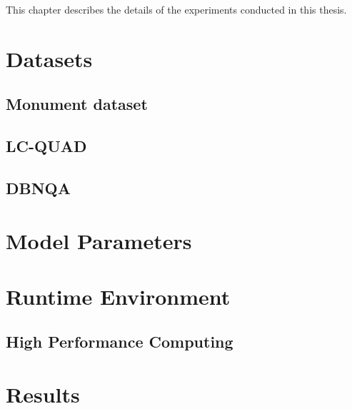 
This chapter describes the details of the experiments conducted in this thesis. 

\section{Datasets} \label{section:datasets}

\subsection{Monument dataset}

\subsection{LC-QUAD}

\subsection{DBNQA}

\section{Model Parameters} \label{section:model parameters}

\section{Runtime Environment} \label{section:runtime environment}

\subsection{High Performance Computing} \label{subsection:hpc}

\section{Results} \label{section:results}